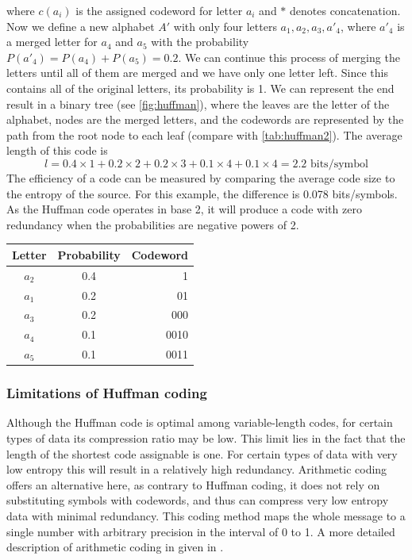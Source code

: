      where $c(a_i)$ is the assigned codeword for letter $a_i$ and $*$ denotes concatenation. Now we define a new alphabet $A'$ with only four letters $a_1, a_2, a_3, a'_4$, where $a'_4$ is a merged letter for $a_4$ and $a_5$ with the probability $P(a'_4) = P(a_4) + P(a_5) = 0.2$. We can continue this process of merging the letters until all of them are merged and we have only one letter left. Since this contains all of the original letters, its probability is 1. We can represent the end result in a binary tree (see \autoref{fig:huffman}), where the leaves are the letter of the alphabet, nodes are the merged letters, and the codewords are represented by the path from the root node to each leaf (compare with \autoref{tab:huffman2}). The average length of this code is
      \begin{equation}
        l = 0.4\times 1 + 0.2 \times 2 + 0.2 \times 3 + 0.1 \times 4 + 0.1 \times 4 = 2.2 \text{ bits/symbol}
      \end{equation}
      The efficiency of a code can be measured by comparing the average code size to the entropy of the source. For this example, the difference is 0.078 bits/symbols. As the Huffman code operates in base 2, it will produce a code with zero redundancy when the probabilities are negative powers of 2.
  
      \begin{table}
        \centering
        \begin{tabular}{ccr}
          \toprule
          Letter & Probability & Codeword \\
          \midrule
          $a_2$ & 0.4 & 1 \\
          $a_1$ & 0.2 & 01 \\
          $a_3$ & 0.2 & 000 \\
          $a_4$ & 0.1 & 0010 \\
          $a_5$ & 0.1 & 0011 \\
          \bottomrule
        \end{tabular}
        \label{tab:huffman2}
      \end{table}

    \subsubsection{Limitations of Huffman coding}
      Although the Huffman code is optimal among variable-length codes, for certain types of data its compression ratio may be low. This limit lies in the fact that the length of the shortest code assignable is one. For certain types of data with very low entropy this will result in a relatively high redundancy. Arithmetic coding offers an alternative here, as contrary to Huffman coding, it does not rely on substituting symbols with codewords, and thus can compress very low entropy data with minimal redundancy. This coding method maps the whole message to a single number with arbitrary precision in the interval of 0 to 1. A more detailed description of arithmetic coding in given in \cite{sayood_introduction_2012}.

